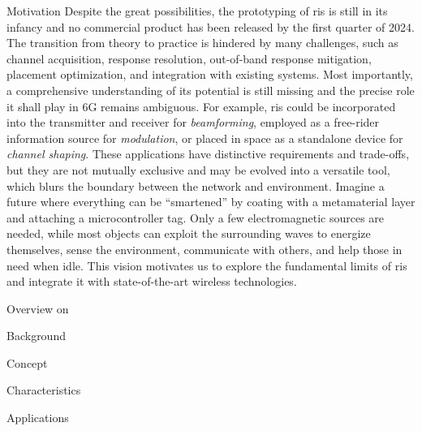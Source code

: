 \begin{section}{Motivation}
	Despite the great possibilities, the prototyping of \gls{ris} is still in its infancy and no commercial product has been released by the first quarter of 2024.
	The transition from theory to practice is hindered by many challenges, such as channel acquisition, response resolution, out-of-band response mitigation, placement optimization, and integration with existing systems.
	Most importantly, a comprehensive understanding of its potential is still missing and the precise role it shall play in 6G remains ambiguous.
	For example, \gls{ris} could be incorporated into the transmitter and receiver for \emph{beamforming}, employed as a free-rider information source for \emph{modulation}, or placed in space as a standalone device for \emph{channel shaping}.
	These applications have distinctive requirements and trade-offs, but they are not mutually exclusive and may be evolved into a versatile tool, which blurs the boundary between the network and environment.
	Imagine a future where everything can be ``smartened'' by coating with a metamaterial layer and attaching a microcontroller tag.
	Only a few electromagnetic sources are needed, while most objects can exploit the surrounding waves to energize themselves, sense the environment, communicate with others, and help those in need when idle.
	This vision motivates us to explore the fundamental limits of \gls{ris} and integrate it with state-of-the-art wireless technologies.
\end{section}

\begin{section}{Overview on }
	\begin{subsection}{Background}

	\end{subsection}

	\begin{subsection}{Concept}

	\end{subsection}

	\begin{subsection}{Characteristics}

	\end{subsection}

	\begin{subsection}{Applications}

	\end{subsection}
\end{section}

